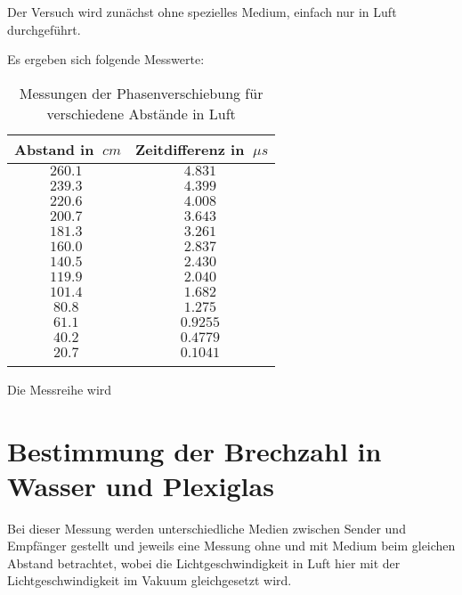 Der Versuch wird zunächst ohne spezielles Medium, einfach nur in Luft durchgeführt.

Es ergeben sich folgende Messwerte:

\begin{table}[h!]
    \begin{center}
        \caption{Messungen der Phasenverschiebung für verschiedene Abstände in Luft}
        \begin{tabular}{cc}
            \hline
            Abstand in $\SI{}{cm}$ & Zeitdifferenz in $\SI{}{\mu s}$ \\
            \hline
            $\SI{260,1}{}$    & $\SI{4,831}{}$ \\
            $\SI{239,3}{}$    & $\SI{4,399}{}$ \\
            $\SI{220,6}{}$    & $\SI{4,008}{}$ \\
            $\SI{200,7}{}$    & $\SI{3,643}{}$ \\
            $\SI{181,3}{}$    & $\SI{3,261}{}$ \\
            $\SI{160,0}{}$    & $\SI{2,837}{}$ \\
            $\SI{140,5}{}$    & $\SI{2,430}{}$ \\
            $\SI{119,9}{}$    & $\SI{2,040}{}$ \\
            $\SI{101,4}{}$    & $\SI{1,682}{}$ \\
            $\SI{80,8}{}$     & $\SI{1,275}{}$ \\
            $\SI{61,1}{}$     & $\SI{0,9255}{}$ \\
            $\SI{40,2}{}$     & $\SI{0,4779}{}$ \\
            $\SI{20,7}{}$     & $\SI{0,1041}{}$ \\
            \hline
            \label{tab:Messwerte-Zeitdiffernz-Abstand}
        \end{tabular}
    \end{center}
\end{table}

Die Messreihe wird 

\section{Bestimmung der Brechzahl in Wasser und Plexiglas}

Bei dieser Messung werden unterschiedliche Medien zwischen Sender und Empfänger gestellt und jeweils eine Messung ohne und mit Medium beim gleichen Abstand betrachtet, wobei die Lichtgeschwindigkeit in Luft hier mit der Lichtgeschwindigkeit im Vakuum gleichgesetzt wird.

